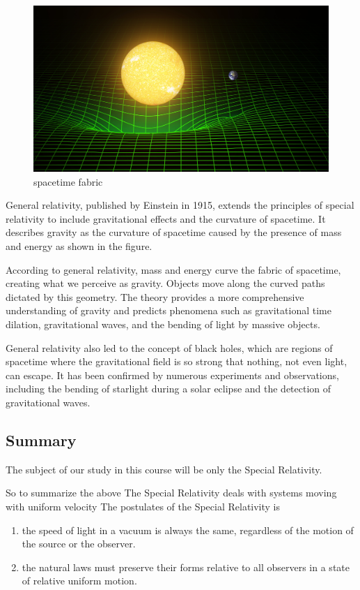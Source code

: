 \documentclass{article}
\begin{document}
\begin{figure}
    \centering
    \includegraphics[width=1\linewidth,keepaspectratio]{spacetimefabric}
    \captionlabelfalse
    \caption{spacetime fabric}
    \label{fig:spacetimefabric} 
\end{figure}
General relativity, published by Einstein in 1915, extends the principles of special relativity to include gravitational effects and the curvature of spacetime. It describes gravity as the curvature of spacetime caused by the presence of mass and energy as shown in the figure.\par
According to general relativity, mass and energy curve the fabric of spacetime, creating what we perceive as gravity. Objects move along the curved paths dictated by this geometry. The theory provides a more comprehensive understanding of gravity and predicts phenomena such as gravitational time dilation, gravitational waves, and the bending of light by massive objects.\par
General relativity also led to the concept of black holes, which are regions of spacetime where the gravitational field is so strong that nothing, not even light, can escape. It has been confirmed by numerous experiments and observations, including the bending of starlight during a solar eclipse and the detection of gravitational waves.\par

\subsection{Summary}
The subject of our study in this course will be only the Special Relativity. 

So to summarize the above
The Special Relativity deals with systems moving with uniform velocity
The postulates of the Special Relativity is
\begin{enumerate}
\item the speed of light in a vacuum is always the same, regardless of the motion of the source or the observer. 
\item the natural laws must preserve their forms relative to all observers in a state of relative uniform motion.
\end{enumerate}
\end{document}
